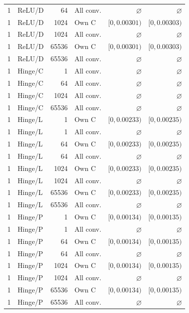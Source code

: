 \begin{longtable}{llrlrr}
1 & ReLU/D & 64 & All conv. & $\varnothing$ & $\varnothing$ \\
1 & ReLU/D & 1024 & Own C & $[0, 0.00301)$ & $[0, 0.00303)$ \\
1 & ReLU/D & 1024 & All conv. & $\varnothing$ & $\varnothing$ \\
1 & ReLU/D & 65536 & Own C & $[0, 0.00301)$ & $[0, 0.00303)$ \\
1 & ReLU/D & 65536 & All conv. & $\varnothing$ & $\varnothing$ \\
1 & Hinge/C & 1 & All conv. & $\varnothing$ & $\varnothing$ \\
1 & Hinge/C & 64 & All conv. & $\varnothing$ & $\varnothing$ \\
1 & Hinge/C & 1024 & All conv. & $\varnothing$ & $\varnothing$ \\
1 & Hinge/C & 65536 & All conv. & $\varnothing$ & $\varnothing$ \\
1 & Hinge/L & 1 & Own C & $[0, 0.00233)$ & $[0, 0.00235)$ \\
1 & Hinge/L & 1 & All conv. & $\varnothing$ & $\varnothing$ \\
1 & Hinge/L & 64 & Own C & $[0, 0.00233)$ & $[0, 0.00235)$ \\
1 & Hinge/L & 64 & All conv. & $\varnothing$ & $\varnothing$ \\
1 & Hinge/L & 1024 & Own C & $[0, 0.00233)$ & $[0, 0.00235)$ \\
1 & Hinge/L & 1024 & All conv. & $\varnothing$ & $\varnothing$ \\
1 & Hinge/L & 65536 & Own C & $[0, 0.00233)$ & $[0, 0.00235)$ \\
1 & Hinge/L & 65536 & All conv. & $\varnothing$ & $\varnothing$ \\
1 & Hinge/P & 1 & Own C & $[0, 0.00134)$ & $[0, 0.00135)$ \\
1 & Hinge/P & 1 & All conv. & $\varnothing$ & $\varnothing$ \\
1 & Hinge/P & 64 & Own C & $[0, 0.00134)$ & $[0, 0.00135)$ \\
1 & Hinge/P & 64 & All conv. & $\varnothing$ & $\varnothing$ \\
1 & Hinge/P & 1024 & Own C & $[0, 0.00134)$ & $[0, 0.00135)$ \\
1 & Hinge/P & 1024 & All conv. & $\varnothing$ & $\varnothing$ \\
1 & Hinge/P & 65536 & Own C & $[0, 0.00134)$ & $[0, 0.00135)$ \\
1 & Hinge/P & 65536 & All conv. & $\varnothing$ & $\varnothing$ \\

\end{longtable}
